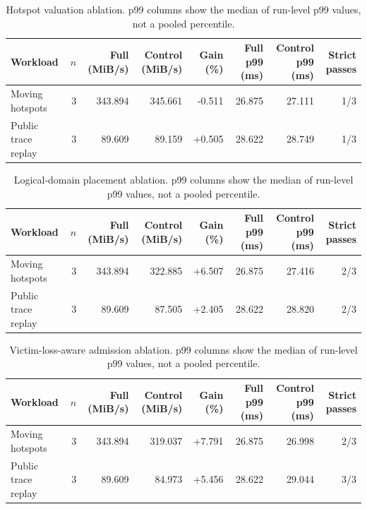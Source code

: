 \begin{table}[t]
\centering
\caption{Hotspot valuation ablation. p99 columns show the median of run-level p99 values, not a pooled percentile.}
\label{tab:tokenfs-independent-1}
\begin{tabular}{lrrrrrrr}
\toprule
Workload & $n$ & Full (MiB/s) & Control (MiB/s) & Gain (\%) & Full p99 (ms) & Control p99 (ms) & Strict passes \\
\midrule
Moving hotspots & 3 & 343.894 & 345.661 & -0.511 & 26.875 & 27.111 & 1/3 \\
Public trace replay & 3 & 89.609 & 89.159 & +0.505 & 28.622 & 28.749 & 1/3 \\
\bottomrule
\end{tabular}
\end{table}

\begin{table}[t]
\centering
\caption{Logical-domain placement ablation. p99 columns show the median of run-level p99 values, not a pooled percentile.}
\label{tab:tokenfs-independent-2}
\begin{tabular}{lrrrrrrr}
\toprule
Workload & $n$ & Full (MiB/s) & Control (MiB/s) & Gain (\%) & Full p99 (ms) & Control p99 (ms) & Strict passes \\
\midrule
Moving hotspots & 3 & 343.894 & 322.885 & +6.507 & 26.875 & 27.416 & 2/3 \\
Public trace replay & 3 & 89.609 & 87.505 & +2.405 & 28.622 & 28.820 & 2/3 \\
\bottomrule
\end{tabular}
\end{table}

\begin{table}[t]
\centering
\caption{Victim-loss-aware admission ablation. p99 columns show the median of run-level p99 values, not a pooled percentile.}
\label{tab:tokenfs-independent-3}
\begin{tabular}{lrrrrrrr}
\toprule
Workload & $n$ & Full (MiB/s) & Control (MiB/s) & Gain (\%) & Full p99 (ms) & Control p99 (ms) & Strict passes \\
\midrule
Moving hotspots & 3 & 343.894 & 319.037 & +7.791 & 26.875 & 26.998 & 2/3 \\
Public trace replay & 3 & 89.609 & 84.973 & +5.456 & 28.622 & 29.044 & 3/3 \\
\bottomrule
\end{tabular}
\end{table}

